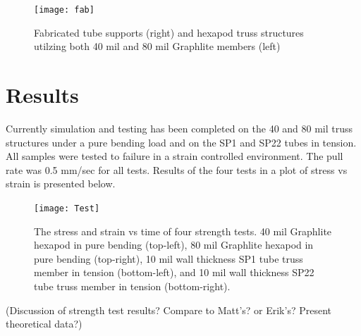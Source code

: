 \documentclass[final]{svjour2}
\begin{document}
\begin{figure}[!ht]
\begin{center}
\texttt{[image: fab]}
\end{center}
\caption{Fabricated tube supports (right) and hexapod truss structures utilzing both 40 mil and 80 mil Graphlite members (left)}
\label{fab}
\end{figure}

\section{Results}
Currently simulation and testing has been completed on the 40 and 80 mil truss structures under a pure bending load and on the SP1 and SP22 tubes in tension.  All samples were tested to failure in a strain controlled environment.  The pull rate was 0.5 mm/sec for all tests.  Results of the four tests in a plot of stress vs strain is presented below.

\begin{figure}[!ht]
\begin{center}
\texttt{[image: Test]}
\end{center}
\caption{The stress and strain vs time of four strength tests. 40 mil Graphlite hexapod in pure bending (top-left), 80 mil Graphlite hexapod in pure bending (top-right), 10 mil wall thickness SP1 tube truss member in tension (bottom-left), and 10 mil wall thickness SP22 tube truss member in tension (bottom-right).}
\label{Test}
\end{figure}
(Discussion of strength test results? Compare to Matt's? or Erik's? Present theoretical data?)
\end{document}
